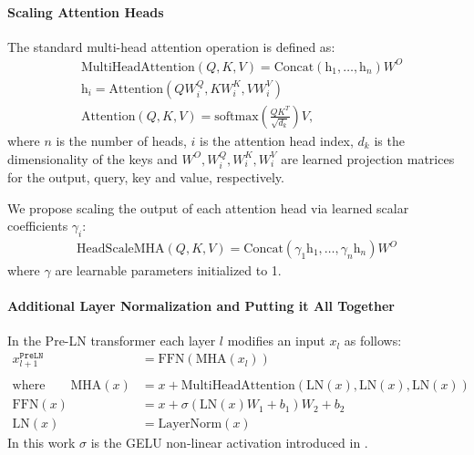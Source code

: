 \documentclass{article} %
\begin{document}
\paragraph{Scaling Attention Heads}%

The standard multi-head attention operation is defined as:
\begin{align*}
&\mathrm{MultiHeadAttention}(Q,K,V) = \mathrm{Concat}(\mathrm{h}_1,\dots,\mathrm{h}_n) W^O \label{eqn:multihead_att}\\ 
&\mathrm{h}_i = \mathrm{Attention}(QW^Q_i, KW^K_i, VW^V_i) \\
&\mathrm{Attention}(Q,K,V) = \mathrm{softmax}\left(\frac{QK^T}{\sqrt{d_k}}\right)V ,
\end{align*}
where $n$ is the number of heads, $i$ is the attention head index, $d_k$ is the dimensionality of the keys and $W^O,W^Q_i,W^K_i,W^V_i$ are learned projection matrices for the output, query, key and value, respectively.

We propose scaling the output of each attention head via learned scalar coefficients $\gamma_i$:
\begin{align*}
\mathrm{HeadScaleMHA}(Q,K,V) = \mathrm{Concat}(\gamma_1 \mathrm{h}_1,\dots,\gamma_n \mathrm{h}_n) W^O
\end{align*}
where $\gamma$ are learnable parameters initialized to 1.



\paragraph{Additional Layer Normalization and Putting it All Together}%

In the Pre-LN transformer each layer $l$ modifies an input $x_l$ as follows:
\begin{align*}
x_{l+1}^{\texttt{PreLN}} &= \mathrm{FFN}(\mathrm{MHA}(x_l)) \\
\\
\mathrm{where\qquad} \mathrm{MHA}(x) &= x + \mathrm{MultiHeadAttention}(\mathrm{LN}(x),\mathrm{LN}(x),\mathrm{LN}(x)) \\
\mathrm{FFN}(x) &= x + \sigma(\mathrm{LN}(x)W_1 + b_1) W_2 + b_2 \\
\mathrm{LN}(x) &= \mathrm{LayerNorm}(x)
\end{align*}
In this work $\sigma$ is the GELU non-linear activation introduced in \citet{hendrycks2016gelu}.
\end{document}
